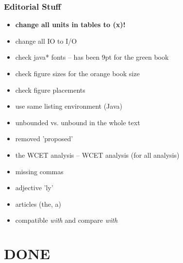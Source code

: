 \subsection{Editorial Stuff}

\begin{itemize}
  \item \textbf{change all units in tables to (x)!}
  \item change all IO to I/O
  \item check java* fonts -- has been 9pt for the green book
  \item check figure sizes for the orange book size
  \item check figure placements
  \item use same listing environment (Java)
  \item unbounded vs. unbound in the whole text
  \item removed 'proposed'
  \item the WCET analysis -- WCET analysis (for all analysis)
  \item missing commas
  \item adjective 'ly'
  \item articles (the, a)
  \item compatible \emph{with} and compare \emph{with}
\end{itemize}


\chapter{DONE}

